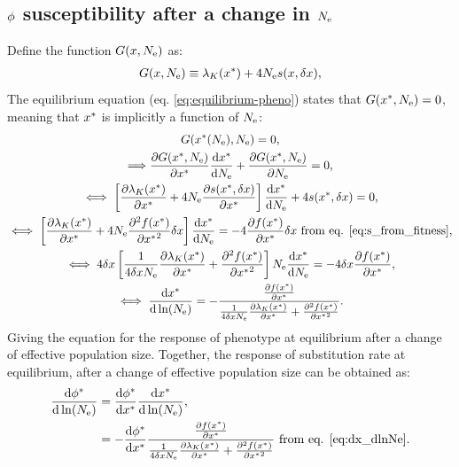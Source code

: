 \subsection{\texorpdfstring{$\phi$}{φ} susceptibility after a change in \texorpdfstring{$N_{\mathrm{e}}$}{Nₑ}}
Define the function $G(x, N_{\mathrm{e}} )$ as:
\begin{gather}
G(x, N_{\mathrm{e}} ) \equiv \lambda_K (x^{*}) + 4 N_{\mathrm{e}} s(x, \delta x), 
\end{gather}
The equilibrium equation (eq. \ref{eq:equilibrium-pheno}) states that $G(x^{*}, N_{\mathrm{e}} )=0$, meaning that $x^{*}$ is implicitly a function of $N_{\mathrm{e}}$:
\begin{gather}
G(x^{*}(N_{\mathrm{e}}), N_{\mathrm{e}} ) = 0, \\
\Longrightarrow \frac{\partial G(x^{*}, N_{\mathrm{e}} ) }{\partial x^{*} }\frac{ \mathrm{d} x^{*}}{\mathrm{d} N_{\mathrm{e}}} + \frac{ \partial G(x^{*}, N_{\mathrm{e}} )}{\partial N_{\mathrm{e}}} = 0, \\
\iff \left[  \frac{\partial \lambda_K (x^{*}) }{\partial x^{*} }  + 4 N_{\mathrm{e}} \frac{ \partial s(x^{*}, \delta x) }{\partial x^{*} } \right]\frac{ \mathrm{d} x^{*}}{\mathrm{d} N_{\mathrm{e}}} + 4 s(x^{*}, \delta x) = 0, \\
\iff \left[  \frac{\partial \lambda_K (x^{*}) }{\partial x^{*} } + 4 N_{\mathrm{e}} \frac{ \partial^2 f (x^{*}) }{\partial {x^{*}}^2}\delta x \right]\frac{ \mathrm{d} x^{*}}{\mathrm{d} N_{\mathrm{e}}}  = - 4 \frac{ \partial f (x^{*}) }{\partial {x^{*}}}\delta x \text{ from eq. \ref{eq:s_from_fitness}}, \\
\iff 4 \delta x \left[ \frac{1}{4 \delta x N_{\mathrm{e}} } \frac{\partial \lambda_K (x^{*}) }{\partial x^{*} } + \frac{ \partial^2 f (x^{*}) }{\partial {x^{*}}^2} \right] N_{\mathrm{e}} \frac{ \mathrm{d} x^{*}}{\mathrm{d} N_{\mathrm{e}}}  = - 4 \delta x \frac{ \partial f (x^{*}) }{\partial {x^{*}}}, \\
\iff \frac{ \mathrm{d} x^{*}}{\mathrm{d} \ln (N_{\mathrm{e}})}  = - \frac{\frac{ \partial f (x^{*}) }{\partial {x^{*}}}}{\frac{1}{4 \delta x N_{\mathrm{e}}} \frac{\partial \lambda_K (x^{*}) }{\partial x^{*} } + \frac{ \partial^2 f (x^{*}) }{\partial {x^{*}}^2}}  \label{eq:dx_dlnNe}.
\end{gather}
Giving the equation for the response of phenotype at equilibrium after a change of effective population size.
Together, the response of substitution rate at equilibrium, after a change of effective population size can be obtained as:
\begin{align}
\frac{\mathrm{d} \phi^{*}}{\mathrm{d} \ln (N_{\mathrm{e}})} & = \frac{\mathrm{d} \phi^{*}}{\mathrm{d} x^{*}} \frac{ \mathrm{d} x^{*}}{\mathrm{d} \ln (N_{\mathrm{e}})}, \\
 &= - \frac{\mathrm{d} \phi^{*}}{\mathrm{d} x^{*}} \frac{\frac{ \partial f (x^{*}) }{\partial {x^{*}}}}{\frac{1}{4 \delta x N_{\mathrm{e}} } \frac{\partial \lambda_K (x^{*}) }{\partial x^{*} } + \frac{ \partial^2 f (x^{*}) }{\partial {x^{*}}^2}} \text{ from eq. \ref{eq:dx_dlnNe}} \label{eq:dw_dlnNe}.
\end{align}
